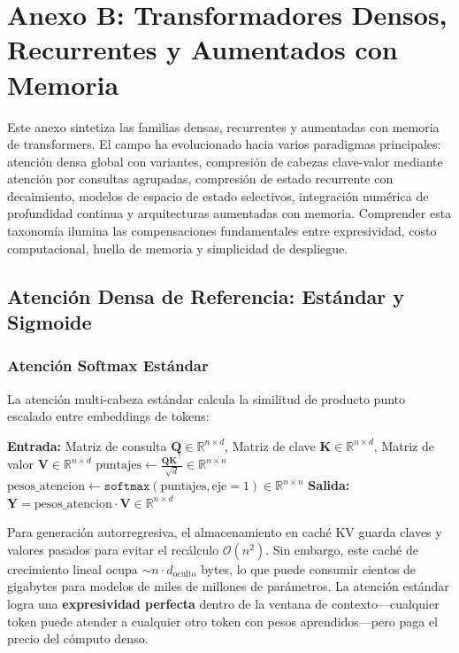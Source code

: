 \section{Anexo B: Transformadores Densos, Recurrentes y Aumentados con Memoria}
\label{sec:annex-transformer}

Este anexo sintetiza las familias densas, recurrentes y aumentadas con memoria de transformers. El campo ha evolucionado hacia varios paradigmas principales: atención densa global con variantes, compresión de cabezas clave-valor mediante atención por consultas agrupadas, compresión de estado recurrente con decaimiento, modelos de espacio de estado selectivos, integración numérica de profundidad continua y arquitecturas aumentadas con memoria. Comprender esta taxonomía ilumina las compensaciones fundamentales entre expresividad, costo computacional, huella de memoria y simplicidad de despliegue.

\subsection{Atención Densa de Referencia: Estándar y Sigmoide}

\subsubsection{Atención Softmax Estándar}
La atención multi-cabeza estándar \citep{vaswani_attention_2017} calcula la similitud de producto punto escalado entre embeddings de tokens:

\begin{algorithmic}[1]
\State \textbf{Entrada:} Matriz de consulta $\mathbf{Q} \in \mathbb{R}^{n \times d}$, Matriz de clave $\mathbf{K} \in \mathbb{R}^{n \times d}$, Matriz de valor $\mathbf{V} \in \mathbb{R}^{n \times d}$
\State $\text{puntajes} \gets \frac{\mathbf{Q}\mathbf{K}^\top}{\sqrt{d}} \in \mathbb{R}^{n \times n}$ 
\State $\text{pesos\_atencion} \gets \texttt{softmax}(\text{puntajes}, \text{eje}=1) \in \mathbb{R}^{n \times n}$ 
\State \textbf{Salida:} $\mathbf{Y} = \text{pesos\_atencion} \cdot \mathbf{V} \in \mathbb{R}^{n \times d}$ 
\end{algorithmic}

Para generación autorregresiva, el almacenamiento en caché KV guarda claves y valores pasados para evitar el recálculo $\mathcal{O}(n^2)$. Sin embargo, este caché de crecimiento lineal ocupa $\sim n \cdot d_{\text{oculto}}$ bytes, lo que puede consumir cientos de gigabytes para modelos de miles de millones de parámetros. La atención estándar logra una \textbf{expresividad perfecta} dentro de la ventana de contexto---cualquier token puede atender a cualquier otro token con pesos aprendidos---pero paga el precio del cómputo denso.

